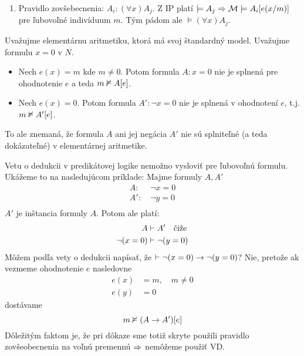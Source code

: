 \begin{dokaz}
\begin{enumerate}
\begin{enumerate}
        \item Pravidlo zovšebecnenia: $A_i: (\forall x) A_j$.
            Z IP platí $\models A_j \Rightarrow
                \mathcal{M} \models A_i[e(x/m)]$
            pre ľubovoľné indivíduum $m$. Tým pádom ale
            $\models (\forall x) A_j$.
            
        \end{enumerate}
    \end{enumerate}
\end{dokaz}


\begin{priklad} %
    Uvažujme elementárnu aritmetiku, ktorá má svoj štandardný
    model. Uvažujme formulu $x=0$ v $N$.
    \begin{itemize}
        \item Nech $e(x) = m$ kde $m \neq 0$. Potom formula $A:x=0$ nie je
        splnená pre ohodnotenie $e$ a teda $m \nvDash A[e]$.
        \item Nech $e(x) = 0$. Potom formula $A': \neg x=0$ nie je
        splnená v ohodnotení $e$, t.j. $m \nvDash A'[e]$.
    \end{itemize}
    To ale znemaná, že formula $A$ ani jej negácia $A'$
    nie sú splniteľné (a teda dokázateľné) v elementárnej aritmetike.
\end{priklad}


\begin{poznamka} %
    Vetu o dedukcii v predikátovej logike nemožno vysloviť pre
    ľubovoľnú formulu. Ukážeme to na nasledujúcom príklade: Majme
    formuly $A,A'$
    \begin{align*}
            A :\ & \neg x=0 \\
            A':\ & \neg y=0 \\
    \end{align*}
    $A'$ je inštancia formuly $A$. Potom ale platí:
    \begin{align*}
            A &\vdash A'  \quad \mbox{čiže}\\
            \neg (x=0) &\vdash \neg (y=0)
    \end{align*}
    Môžem podľa vety o dedukcii napísať, že 
    $\vdash \neg (x=0) \rightarrow \neg (y=0)$? Nie, pretože ak
    vezmeme ohodnotenie $e$ nasledovne
    \begin{align*}
        e(x) &= m, \quad m \neq 0 \\
        e(y) &= 0
    \end{align*}
    dostávame
    \begin{equation*}
        m \nvDash (A \rightarrow A')[e]
    \end{equation*}
    Dôležitým faktom je, že pri dôkaze sme totiž skryte použili
    pravidlo zovšeobecnenia na voľnú premennú $\Rightarrow$ nemôžeme použiť
    VD.
\end{poznamka}

